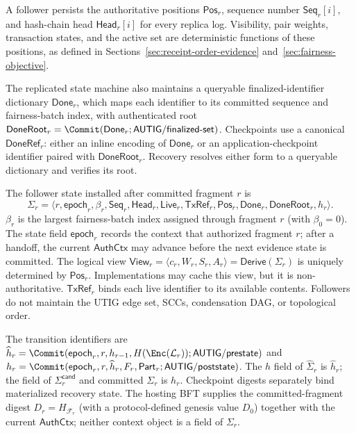 A follower persists the authoritative positions $\mathsf{Pos}_r$, sequence number $\mathsf{Seq}_r[i]$, and hash-chain head $\mathsf{Head}_r[i]$ for every replica log.  Visibility, pair weights, transaction states, and the active set
are deterministic functions of these positions, as defined in
Sections~\ref{sec:receipt-order-evidence} and~\ref{sec:fairness-objective}.

The replicated state machine also maintains a queryable finalized-identifier dictionary $\mathsf{Done}_r$, which maps each identifier to its committed sequence and fairness-batch index, with authenticated root $\mathsf{DoneRoot}_r=\Commit(\mathsf{Done}_r; \mathsf{AUTIG/finalized\mbox{-}set})$. Checkpoints use a canonical $\mathsf{DoneRef}_r$: either an inline encoding of $\mathsf{Done}_r$ or an application-checkpoint identifier paired with $\mathsf{DoneRoot}_r$. Recovery resolves either form to a queryable dictionary and verifies its root.

The follower state installed after committed fragment $r$ is
\begin{equation}
 \Sigma_r=\langle r,\mathsf{epoch}_r,\beta_r,\mathsf{Seq}_r,
 \mathsf{Head}_r,\mathsf{Live}_r,\mathsf{TxRef}_r,\mathsf{Pos}_r,
 \mathsf{Done}_r,\mathsf{DoneRoot}_r,h_r\rangle.
 \label{eq:follower-state}
\end{equation}
$\beta_r$ is the largest fairness-batch index assigned through fragment $r$ (with $\beta_0=0$).  The state field $\mathsf{epoch}_r$ records the context that authorized fragment $r$; after a handoff, the current $\mathsf{AuthCtx}$ may
advance before the next evidence state is committed.  The logical view $\mathsf{View}_r=\langle c_r,W_r,S_r,A_r\rangle
=\mathsf{Derive}(\Sigma_r)$ is uniquely determined by $\mathsf{Pos}_r$. Implementations may cache this view, but it is non-authoritative. $\mathsf{TxRef}_r$ binds each live identifier to its available contents. Followers do not maintain the UTIG edge set, SCCs, condensation DAG, or topological order.

The transition identifiers are $\widehat h_r=\Commit(\mathsf{epoch}_r,r,h_{r-1},H(\Enc(\mathcal L_r));
\mathsf{AUTIG/prestate})$ and $h_r=\Commit(\mathsf{epoch}_r,r,\widehat h_r,F_r,\mathsf{Part}_r; \mathsf{AUTIG/poststate})$.  The $h$ field of $\widehat\Sigma_r$ is $\widehat h_r$; the field of $\Sigma_r^{\mathsf{cand}}$ and committed $\Sigma_r$ is $h_r$.  Checkpoint digests separately bind materialized recovery state. The hosting BFT supplies the committed-fragment digest $D_r=H_{\mathcal F_r}$ (with a protocol-defined genesis value $D_0$) together with the current $\mathsf{AuthCtx}$; neither context object is a field of $\Sigma_r$.

